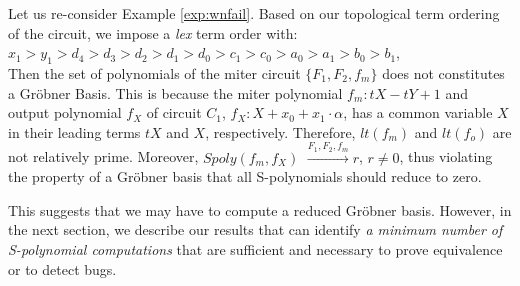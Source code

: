 
\begin{Example}\label{exp:1bitmiter}
Let us re-consider Example \ref{exp:wnfail}. Based on our topological
term ordering of the circuit, we impose a {\it lex} term order with: \\  
$ x_1 >  y_1 > d_4 > d_3 > d_2 > d_1> d_0 >c_1 > c_0 > a_0 > a_1 > b_0 > b_1$, \\ 
Then the set of polynomials of the miter circuit
$\{ F_{1},F_{2}, f_{m} \}$ does not constitutes a Gr\"obner
Basis. This is because the miter polynomial $f_m: t X - t Y+1$
and output polynomial $f_X$ of circuit $C_1$, $f_X: X+x_0+x_1\cdot
\alpha$, has a common variable $X$  in their leading terms $tX$
and $X$, respectively. Therefore, $lt(f_m)$ and $lt(f_o)$ are not
relatively prime. Moreover, $Spoly(f_m,f_X)$ $\stackrel{F_1, F_2,
  f_m}{\longrightarrow} r$, $r\neq 0$, thus violating the property of
a Gr\"obner basis that all S-polynomials should reduce to zero. 
\end{Example}

This suggests that we may have to compute a reduced Gr\"obner
basis. However, in the next section, we describe our results that can
identify {\it a minimum number of S-polynomial computations} that are
sufficient and necessary to prove equivalence or to detect bugs. 

